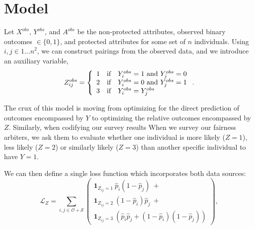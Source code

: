     
    
    
\section{Model}\label{sec:softmono_model}

    Let $X^{obs}$, $Y^{obs}$, and $A^{obs}$ be the non-protected attributes, observed binary outcomes $\in \{0, 1\}$, and protected attributes for some set of $n$ individuals.  Using $i, j \in {1 \ldots n}^2$, we can construct pairings from the observed data, and we introduce an auxiliary variable,
    $$ Z_{ij}^{obs} = \left\{ \begin{array}{l c l}
        1 & \mbox{if} & Y_i^{obs} = 1 \mbox{~and~} Y_j^{obs} = 0 \\
        2 & \mbox{if} & Y_i^{obs} = 0 \mbox{~and~} Y_j^{obs} = 1 \\
        3 & \mbox{if} & Y_i^{obs} = Y_j^{obs}
    \end{array}\right. .$$
    
    The crux of this model is moving from optimizing for the direct prediction of outcomes encompassed by $Y$ to optimizing the relative outcomes encompassed by $Z$.  Similarly, when codifying our survey results When we survey our fairness arbiters, we ask them to evaluate whether one individual is more likely ($Z = 1$), less likely ($Z = 2$) or similarly likely ($Z = 3$) than another specific individual to have $Y = 1$.
    
    We can then define a single loss function which incorporates both data sources:
    $$ \mathcal{L}_Z = \sum\limits_{i, j \in \mathcal{O} + \mathcal{S}} \left(\begin{array}{l} 
        \mathbf{1}_{Z_{ij} = 1} ~ \hat{p}_i (1 - \hat{p}_j) ~ + \\
        \mathbf{1}_{Z_{ij} = 2} ~ (1 - \hat{p}_i) \hat{p}_j ~ + \\
        \mathbf{1}_{Z_{ij} = 3} ~ \left(\hat{p}_i \hat{p}_j + (1 - \hat{p}_i)(1 - \hat{p}_j) \right)
    \end{array}\right), \label{eq:sm_pairwise_loss}$$
    
